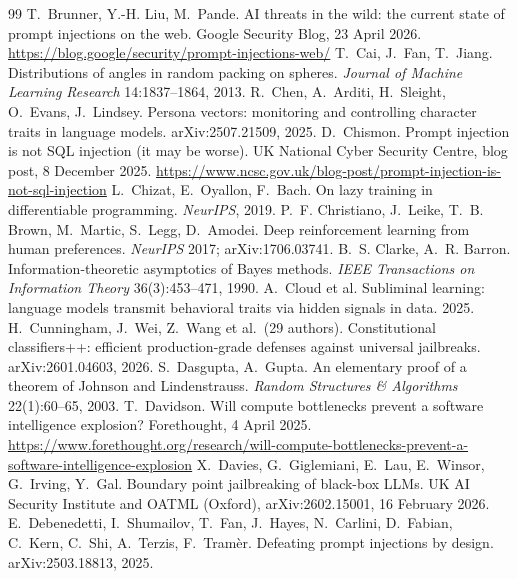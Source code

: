 \begin{thebibliography}{99}
 T.~Brunner, Y.-H. Liu, M.~Pande. AI threats in the wild: the current state of prompt injections on the web. Google Security Blog, 23 April 2026. \url{https://blog.google/security/prompt-injections-web/}
 T.~Cai, J.~Fan, T.~Jiang. Distributions of angles in random packing on spheres. \emph{Journal of Machine Learning Research} 14:1837--1864, 2013.
 R.~Chen, A.~Arditi, H.~Sleight, O.~Evans, J.~Lindsey. Persona vectors: monitoring and controlling character traits in language models. arXiv:2507.21509, 2025.
 D.~Chismon. Prompt injection is not SQL injection (it may be worse). UK National Cyber Security Centre, blog post, 8 December 2025. \url{https://www.ncsc.gov.uk/blog-post/prompt-injection-is-not-sql-injection}
 L.~Chizat, E.~Oyallon, F.~Bach. On lazy training in differentiable programming. \emph{NeurIPS}, 2019.
 P.~F. Christiano, J.~Leike, T.~B. Brown, M.~Martic, S.~Legg, D.~Amodei. Deep reinforcement learning from human preferences. \emph{NeurIPS} 2017; arXiv:1706.03741.
 B.~S. Clarke, A.~R. Barron. Information-theoretic asymptotics of Bayes methods. \emph{IEEE Transactions on Information Theory} 36(3):453--471, 1990.
 A.~Cloud et al. Subliminal learning: language models transmit behavioral traits via hidden signals in data. 2025.
 H.~Cunningham, J.~Wei, Z.~Wang et al.\ (29 authors). Constitutional classifiers++: efficient production-grade defenses against universal jailbreaks. arXiv:2601.04603, 2026.
 S.~Dasgupta, A.~Gupta. An elementary proof of a theorem of Johnson and Lindenstrauss. \emph{Random Structures \& Algorithms} 22(1):60--65, 2003.
 T.~Davidson. Will compute bottlenecks prevent a software intelligence explosion? Forethought, 4 April 2025. \url{https://www.forethought.org/research/will-compute-bottlenecks-prevent-a-software-intelligence-explosion}
 X.~Davies, G.~Giglemiani, E.~Lau, E.~Winsor, G.~Irving, Y.~Gal. Boundary point jailbreaking of black-box LLMs. UK AI Security Institute and OATML (Oxford), arXiv:2602.15001, 16 February 2026.
 E.~Debenedetti, I.~Shumailov, T.~Fan, J.~Hayes, N.~Carlini, D.~Fabian, C.~Kern, C.~Shi, A.~Terzis, F.~Tram\`er. Defeating prompt injections by design. arXiv:2503.18813, 2025.

\end{thebibliography}
